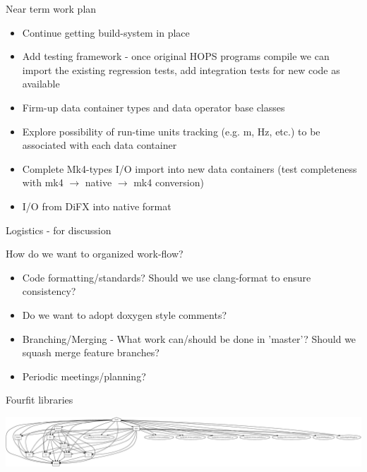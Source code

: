 \documentclass[xcolor=svgnames]{beamer}
\begin{document}
\begin{frame}{Near term work plan}
 
 \begin{itemize}
  \item Continue getting build-system in place
  \item Add testing framework - once original HOPS programs compile we can import the existing regression tests, add integration tests for new code as available
  \item Firm-up data container types and data operator base classes
  \item Explore possibility of run-time units tracking (e.g. m, Hz, etc.) to be associated with each data container
  \item Complete Mk4-types I/O import into new data containers (test completeness with mk4 $\rightarrow$ native $\rightarrow$ mk4 conversion)
  \item I/O from DiFX into native format
 \end{itemize}

 
\end{frame}

\begin{frame}{Logistics - for discussion}
 
 How do we want to organized work-flow?
 
\begin{itemize}
 \item Code formatting/standards? Should we use clang-format to ensure consistency?
 \item Do we want to adopt doxygen style comments?
 \item Branching/Merging - What work can/should be done in 'master'? Should we squash merge feature branches?
 \item Periodic meetings/planning?
\end{itemize}

  
\end{frame}



\begin{frame}{Fourfit libraries}

\begin{center}
      \includegraphics[width=\textwidth]{fourfit.png}\\
\end{center}

\end{frame}
\end{document}
